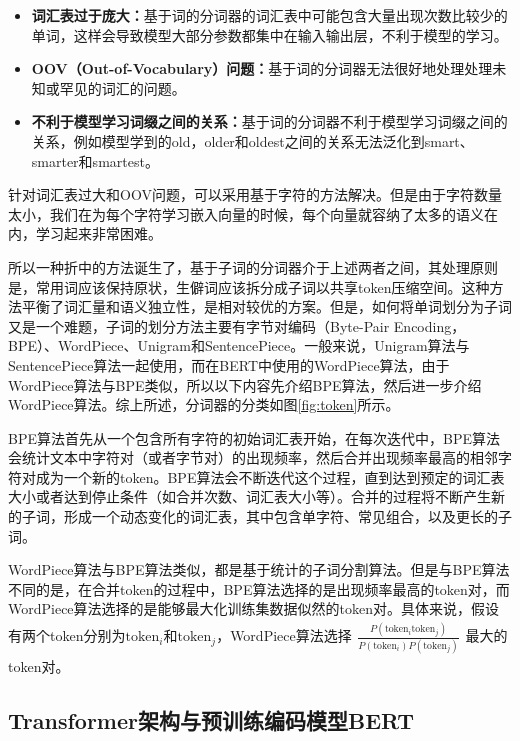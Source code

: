 \begin{itemize}
	\item \textbf{词汇表过于庞大：}基于词的分词器的词汇表中可能包含大量出现次数比较少的单词，这样会导致模型大部分参数都集中在输入输出层，不利于模型的学习。
	\item \textbf{OOV（Out-of-Vocabulary）问题：}基于词的分词器无法很好地处理处理未知或罕见的词汇的问题。
	\item \textbf{不利于模型学习词缀之间的关系：}基于词的分词器不利于模型学习词缀之间的关系，例如模型学到的old，older和oldest之间的关系无法泛化到smart、smarter和smartest。
\end{itemize}

针对词汇表过大和OOV问题，可以采用基于字符的方法解决。但是由于字符数量太小，我们在为每个字符学习嵌入向量的时候，每个向量就容纳了太多的语义在内，学习起来非常困难。

所以一种折中的方法诞生了，基于子词的分词器介于上述两者之间，其处理原则是，常用词应该保持原状，生僻词应该拆分成子词以共享token压缩空间。这种方法平衡了词汇量和语义独立性，是相对较优的方案。但是，如何将单词划分为子词又是一个难题，子词的划分方法主要有字节对编码（Byte-Pair Encoding，BPE）、WordPiece、Unigram和SentencePiece。一般来说，Unigram算法与SentencePiece算法一起使用，而在BERT中使用的WordPiece算法，由于WordPiece算法与BPE类似，所以以下内容先介绍BPE算法，然后进一步介绍WordPiece算法。综上所述，分词器的分类如图\ref{fig:token}所示。



BPE算法首先从一个包含所有字符的初始词汇表开始，在每次迭代中，BPE算法会统计文本中字符对（或者字节对）的出现频率，然后合并出现频率最高的相邻字符对成为一个新的token。BPE算法会不断迭代这个过程，直到达到预定的词汇表大小或者达到停止条件（如合并次数、词汇表大小等）。合并的过程将不断产生新的子词，形成一个动态变化的词汇表，其中包含单字符、常见组合，以及更长的子词。

WordPiece算法与BPE算法类似，都是基于统计的子词分割算法。但是与BPE算法不同的是，在合并token的过程中，BPE算法选择的是出现频率最高的token对，而WordPiece算法选择的是能够最大化训练集数据似然的token对。具体来说，假设有两个token分别为$\text{token}_i$和$\text{token}_j$，WordPiece算法选择$\begin{aligned} \frac{P(\text{token}_i\text{token}_j)}{P(\text{token}_i)P(\text{token}_j)} \end{aligned} $最大的token对。

\subsection{Transformer架构与预训练编码模型BERT}


